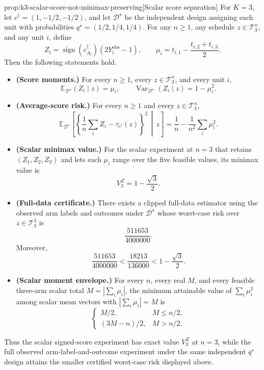 \begin{propositionv}{prop:k3-scalar-score-not-minimax-preserving}[Scalar score separation]
For \(K=3\), let \(c^\dagger=(1,-1/2,-1/2)\), and let \(\mathcal D^\star\) be the independent design assigning each unit with probabilities \(q^\star=(1/2,1/4,1/4)\).  For any \(n\geq 1\), any schedule \(z\in\mathcal T_3^n\), and any unit \(i\), define
\[
Z_i=\operatorname{sign}(c^\dagger_{A_i})(2Y_i^{\mathrm{obs}}-1),
\qquad
\mu_i=t_{i,1}-\frac{t_{i,2}+t_{i,3}}{2}.
\]
Then the following statements hold.
\begin{itemize}
\item \textbf{(Score moments.)}  For every \(n\geq 1\), every \(z\in\mathcal T_3^n\), and every unit \(i\),
\[
\mathbb E_{\mathcal D^\star}(Z_i\mid z)=\mu_i,
\qquad
\operatorname{Var}_{\mathcal D^\star}(Z_i\mid z)=1-\mu_i^2 .
\]
\item \textbf{(Average-score risk.)}  For every \(n\geq 1\) and every \(z\in\mathcal T_3^n\),
\[
\mathbb E_{\mathcal D^\star}\!\left[
\left\{\frac{1}{n}\sum_i Z_i-\tau_{c^\dagger}(z)\right\}^2
\,\middle|\, z\right]
=
\frac{1}{n}-\frac{1}{n^2}\sum_i \mu_i^2 .
\]
\item \textbf{(Scalar minimax value.)}  For the scalar experiment at \(n=3\) that retains \((Z_1,Z_2,Z_3)\) and lets each \(\mu_i\) range over the five feasible values, its minimax value is
\[
V_3^Z=1-\frac{\sqrt 3}{2}.
\]
\item \textbf{(Full-data certificate.)}  There exists a clipped full-data estimator using the observed arm labels and outcomes under \(\mathcal D^\star\) whose worst-case risk over \(z\in\mathcal T_3^3\) is
\[
\frac{511653}{4000000}.
\]
Moreover,
\[
\frac{511653}{4000000}
<
\frac{18213}{136000}
<
1-\frac{\sqrt 3}{2}.
\]
\item \textbf{(Scalar moment envelope.)}  For every \(n\), every real \(M\), and every feasible three-arm scalar total \(M=|\sum_i\mu_i|\), the minimum attainable value of \(\sum_i\mu_i^2\) among scalar mean vectors with \(|\sum_i\mu_i|=M\) is
\[
\begin{cases}
M/2, & M\leq n/2,\\
(3M-n)/2, & M>n/2.
\end{cases}
\]
\end{itemize}
Thus the scalar signed-score experiment has exact value \(V_3^Z\) at \(n=3\), while the full observed arm-label-and-outcome experiment under the same independent \(q^\star\) design attains the smaller certified worst-case risk displayed above.
\end{propositionv}

